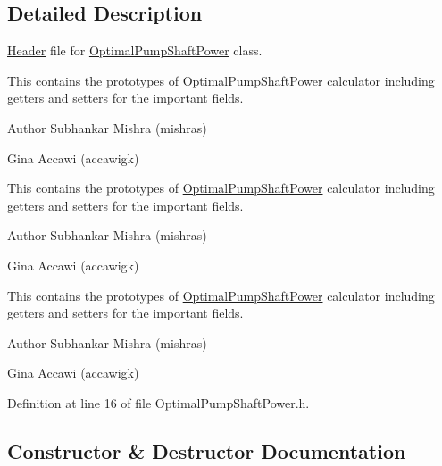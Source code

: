 \subsection{Detailed Description}
\hyperlink{class_header}{Header} file for \hyperlink{class_optimal_pump_shaft_power}{Optimal\+Pump\+Shaft\+Power} class. 

This contains the prototypes of \hyperlink{class_optimal_pump_shaft_power}{Optimal\+Pump\+Shaft\+Power} calculator including getters and setters for the important fields.

\begin{DoxyAuthor}{Author}
Subhankar Mishra (mishras) 

Gina Accawi (accawigk) 
\end{DoxyAuthor}


This contains the prototypes of \hyperlink{class_optimal_pump_shaft_power}{Optimal\+Pump\+Shaft\+Power} calculator including getters and setters for the important fields.

\begin{DoxyAuthor}{Author}
Subhankar Mishra (mishras) 

Gina Accawi (accawigk) 
\end{DoxyAuthor}


This contains the prototypes of \hyperlink{class_optimal_pump_shaft_power}{Optimal\+Pump\+Shaft\+Power} calculator including getters and setters for the important fields.

\begin{DoxyAuthor}{Author}
Subhankar Mishra (mishras) 

Gina Accawi (accawigk) 
\end{DoxyAuthor}


Definition at line 16 of file Optimal\+Pump\+Shaft\+Power.\+h.



\subsection{Constructor \& Destructor Documentation}
\mbox{\label{class_optimal_pump_shaft_power_a6970e2672e4ef7c124a876eda96ee3cc}} 

